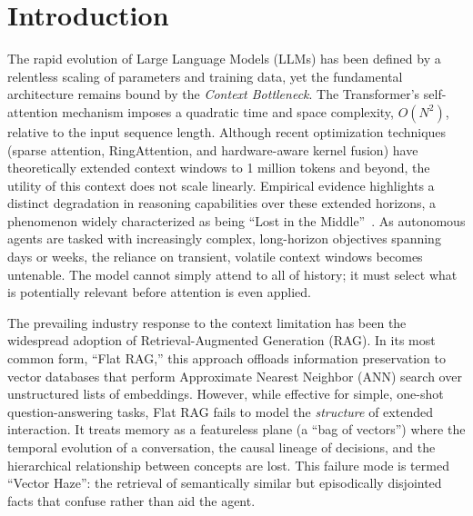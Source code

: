 \documentclass[10pt,twocolumn]{article}
\begin{document}
\begin{abstract}
contribution: six reader-side interventions returning six nulls, a proposed fix retired by analysis \emph{before} implementation, a reader-capability lever that saturates after one rung, and a judge panel showing our own two prior expectations to be wrong.
\end{abstract}

\section{Introduction}

The rapid evolution of Large Language Models (LLMs) has been defined by a relentless scaling of parameters and training data, yet the fundamental architecture remains bound by the \textit{Context Bottleneck}. The Transformer's self-attention mechanism imposes a quadratic time and space complexity, $O(N^2)$, relative to the input sequence length. Although recent optimization techniques (sparse attention, RingAttention, and hardware-aware kernel fusion) have theoretically extended context windows to 1 million tokens and beyond, the utility of this context does not scale linearly. Empirical evidence highlights a distinct degradation in reasoning capabilities over these extended horizons, a phenomenon widely characterized as being ``Lost in the Middle''~\cite{liu2023lost}. As autonomous agents are tasked with increasingly complex, long-horizon objectives spanning days or weeks, the reliance on transient, volatile context windows becomes untenable. The model cannot simply attend to all of history; it must select what is potentially relevant before attention is even applied.

The prevailing industry response to the context limitation has been the widespread adoption of Retrieval-Augmented Generation (RAG). In its most common form, ``Flat RAG,'' this approach offloads information preservation to vector databases that perform Approximate Nearest Neighbor (ANN) search over unstructured lists of embeddings. However, while effective for simple, one-shot question-answering tasks, Flat RAG fails to model the \textit{structure} of extended interaction. It treats memory as a featureless plane (a ``bag of vectors'') where the temporal evolution of a conversation, the causal lineage of decisions, and the hierarchical relationship between concepts are lost. This failure mode is termed ``Vector Haze'': the retrieval of semantically similar but episodically disjointed facts that confuse rather than aid the agent.
\end{document}
